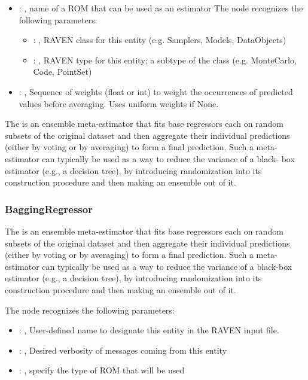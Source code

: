 \begin{itemize}
    \item {}: , 
      name of a ROM that can be used as an estimator
      The  node recognizes the following parameters:
        \begin{itemize}
          \item {}: , 
            RAVEN class for this entity (e.g. Samplers, Models, DataObjects)
          \item {}: , 
            RAVEN type for this entity; a subtype of the class (e.g. MonteCarlo, Code, PointSet)
      \end{itemize}

    \item {}: , 
      Sequence of weights (float or int) to weight the occurrences of predicted
      values before averaging. Uses uniform weights if None.
  \end{itemize}
 The  is an ensemble meta-estimator that fits base regressors each on
 random subsets of the original                             dataset and then aggregate their
 individual predictions (either by voting or by averaging) to form a final
 prediction. Such a meta-estimator can typically be used as a way to reduce the variance of a black-
 box estimator                             (e.g., a decision tree), by introducing randomization
 into its construction procedure and then making an ensemble                             out of it.

\subsubsection{BaggingRegressor}
  The  is an ensemble meta-estimator that fits base regressors each on
  random subsets of the original                             dataset and then aggregate their
  individual predictions (either by voting or by averaging) to form a final
  prediction. Such a meta-estimator can typically be used as a way to reduce the variance of a
  black-box estimator                             (e.g., a decision tree), by introducing
  randomization into its construction procedure and then making an ensemble
  out of it.

  The  node recognizes the following parameters:
    \begin{itemize}
      \item {}: , 
        User-defined name to designate this entity in the RAVEN input file.
      \item {}: , 
        Desired verbosity of messages coming from this entity
      \item {}: , 
        specify the type of ROM that will be used
  \end{itemize}


